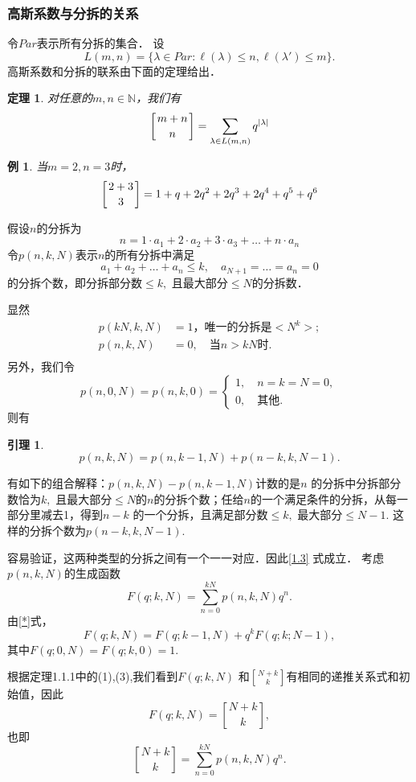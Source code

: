 \documentclass[a4paper,12pt]{ctexart}
\newtheorem{theo}{定理}[section]
\newtheorem{lem}{引理}[section]
\newtheorem{exa}{例}[section]
\begin{document}
\subsubsection{高斯系数与分拆的关系}

令$Par$表示所有分拆的集合．
设
$$L(m,n)=\{\lambda\in Par: \ell(\lambda)\leq n, \ell(\lambda')\leq m\}.$$ 高斯系数和分拆的联系由下面的定理给出．

\begin{theo}
对任意的$m,n\in\mathbb{N}$，我们有
$$\left[{{m+n}\atop {n}}\right]=\sum_{\lambda\in L(m,n)}q^{|\lambda|}$$
\end{theo}

\begin{exa}
当$m=2,n=3$时，
$$\left[{{2+3}\atop {3}}\right]=1+q+2q^2+2q^3+2q^4+q^5+q^6$$
\end{exa}


假设$n$的分拆为
\begin{equation}
n=1\cdot a_1+2\cdot a_2+3\cdot a_3+\ldots+n\cdot a_n
\end{equation}
令$p(n,k,N)$表示$n$的所有分拆中满足
$$a_1+a_2+\ldots+a_n\leq k,\quad
a_{N+1}=\ldots=a_n=0$$的分拆个数，即分拆部分数$\leq k,$
且最大部分$\leq N$的分拆数．

显然
\begin{align*}
p(kN,k,N)&=1\text{，唯一的分拆是}<N^k>;\\
p(n,k,N)&=0,\quad \mbox{当}n>kN\mbox{时}.\\
\end{align*}
另外，我们令
\[
p(n,0,N)=p(n,k,0)=\begin{cases}1,\quad n=k=N=0,\\ 0,\quad
\mbox{其他}.
\end{cases}
\]
则有
\begin{lem}
\begin{equation}\label{1.3}
p(n,k,N)=p(n,k-1,N)+p(n-k,k,N-1).
\end{equation}
\end{lem}
\begin{pf}
有如下的组合解释：$p(n,k,N)-p(n,k-1,N)$计数的是$n$ 的分拆中分拆部分数恰为$k,$
且最大部分$\leq
N$的$n$的分拆个数；任给$n$的一个满足条件的分拆，从每一部分里减去1，得到$n-k$ 的一个分拆，且满足部分数$\leq
k,$ 最大部分$\leq N-1.$ 这样的分拆个数为$p(n-k,k,N-1).$

容易验证，这两种类型的分拆之间有一个一一对应．因此\eqref{1.3} 式成立．
考虑$p(n,k,N)$的生成函数
$$F(q;k,N)=\sum_{n=0}^{kN}p(n,k,N)q^n.$$
由\eqref{*}式，
$$F(q;k,N)=F(q;k-1,N)+q^kF(q;k;N-1),$$
其中$F(q;0,N)=F(q;k,0)=1.$

根据定理1.1.1中的(1),(3),我们看到$F(q;k,N)$ 和${N+k\brack
k}$有相同的递推关系式和初始值，因此
$$F(q;k,N)={N+k\brack k},$$ 也即
$${N+k\brack k}=\sum_{n=0}^{kN}p(n,k,N)q^n.$$
\end{pf}
\end{document}
